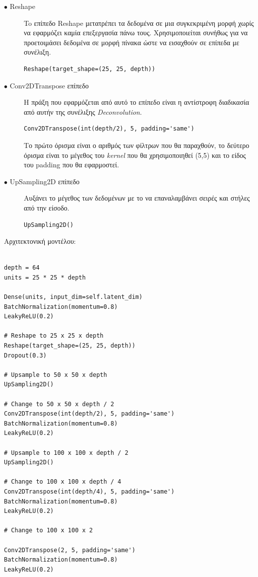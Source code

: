 \begin{description}
\item[$\bullet$ Reshape] To επίπεδο Reshape μετατρέπει τα δεδομένα σε μια συγκεκριμένη μορφή χωρίς να εφαρμόζει καμία επεξεργασία πάνω τους. Χρησιμοποιείται συνήθως για να προετοιμάσει δεδομένα σε μορφή πίνακα ώστε να εισαχθούν σε επίπεδα με συνέλιξη. \cite{reshape}
\par
\begin{verbatim}
Reshape(target_shape=(25, 25, depth))
\end{verbatim}
\end{description}

\begin{description}
\item[$\bullet$ Conv2DTranspose επίπεδο] H πράξη που εφαρμόζεται από αυτό το επίπεδο είναι η αντίστροφη διαδικασία από αυτήν της συνέλιξης \textit{Deconvolution}. \cite{conv2dtranspose}
\begin{verbatim}
Conv2DTranspose(int(depth/2), 5, padding='same')
\end{verbatim}
\par
Το πρώτο όρισμα είναι ο αριθμός των φίλτρων που θα παραχθούν, το δεύτερο όρισμα είναι το μέγεθος του \textit{kernel} που θα χρησιμοποιηθεί (5,5) και το είδος του padding που θα εφαρμοστεί.
\end{description}

\begin{description}
\item[$\bullet$ UpSampling2D επίπεδο] Αυξάνει το μέγεθος των δεδομένων με το να επαναλαμβάνει σειρές και στήλες από την είσοδο. \cite{upsampling2d}
\begin{verbatim}
UpSampling2D() 
\end{verbatim}
\par
\end{description}

Αρχιτεκτονική μοντέλου:
\begin{verbatim}
        
depth = 64
units = 25 * 25 * depth
        
Dense(units, input_dim=self.latent_dim)
BatchNormalization(momentum=0.8)
LeakyReLU(0.2)

# Reshape to 25 x 25 x depth
Reshape(target_shape=(25, 25, depth))
Dropout(0.3)

# Upsample to 50 x 50 x depth
UpSampling2D()

# Change to 50 x 50 x depth / 2
Conv2DTranspose(int(depth/2), 5, padding='same')
BatchNormalization(momentum=0.8)
LeakyReLU(0.2)

# Upsample to 100 x 100 x depth / 2
UpSampling2D()

# Change to 100 x 100 x depth / 4
Conv2DTranspose(int(depth/4), 5, padding='same')
BatchNormalization(momentum=0.8)
LeakyReLU(0.2)

# Change to 100 x 100 x 2
        
Conv2DTranspose(2, 5, padding='same')
BatchNormalization(momentum=0.8)
LeakyReLU(0.2)
\end{verbatim}

